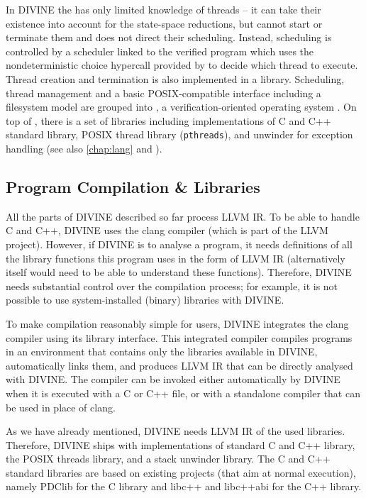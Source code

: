 In DIVINE the \divm has only limited knowledge of threads -- it can take their
existence into account for the state-space reductions, but cannot
start or terminate them and does not direct their scheduling.
Instead, scheduling is controlled by a scheduler linked to the verified program
which uses the nondeterministic choice hypercall provided by \divm to decide
which thread to execute.
Thread creation and termination is also implemented in a library.
Scheduling, thread management and a basic POSIX-compatible interface including
a filesystem model are grouped into \dios, a verification-oriented operating
system .
On top of \dios, there is a set of libraries including implementations of C and C++ standard library, POSIX thread library (\texttt{pthreads}), and unwinder for exception handling (see also \autoref{chap:lang} and ).

\subsection{Program Compilation \& Libraries}

All the parts of DIVINE described so far process LLVM IR.
To be able to handle C and C++, DIVINE uses the clang compiler (which is part of the LLVM project).
However, if DIVINE is to analyse a program, it needs definitions of all the library functions this program uses in the form of LLVM IR (alternatively \divm itself would need to be able to understand these functions).
Therefore, DIVINE needs substantial control over the compilation process; for example, it is not possible to use system-installed (binary) libraries with DIVINE.

To make compilation reasonably simple for users, DIVINE integrates the clang compiler using its library interface.
This integrated compiler compiles programs in an environment that contains only the libraries available in DIVINE, automatically links them, and produces LLVM IR that can be directly analysed with DIVINE.
The compiler can be invoked either automatically by DIVINE when it is executed with a C or C++ file, or with a standalone compiler that can be used in place of clang.

As we have already mentioned, DIVINE needs LLVM IR of the used libraries.
Therefore, DIVINE ships with implementations of standard C and C++ library, the POSIX threads library, and a stack unwinder library.
The C and C++ standard libraries are based on existing projects (that aim at normal execution), namely PDClib for the C library and libc++ and libc++abi for the C++ library.

